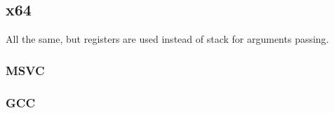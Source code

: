 ﻿\subsection{x64}

{All the same, but registers are used instead of stack for arguments passing}.

\subsubsection{MSVC}



\subsubsection{GCC}




